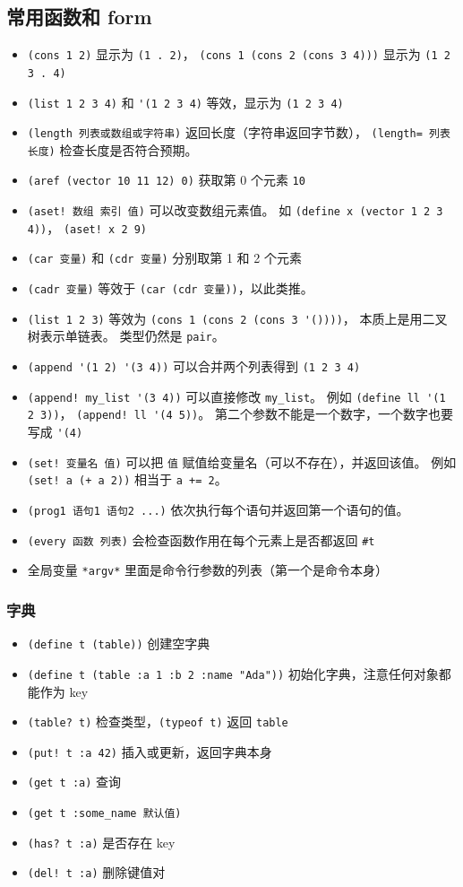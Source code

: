 \subsection{常用函数和 form}
\begin{itemize}
\item \verb`(cons 1 2)` 显示为 \verb`(1 . 2)`， \verb`(cons 1 (cons 2 (cons 3 4)))` 显示为 \verb`(1 2 3 . 4)`
\item \verb`(list 1 2 3 4)` 和 \verb`'(1 2 3 4)` 等效，显示为 \verb`(1 2 3 4)`
\item \verb`(length 列表或数组或字符串)` 返回长度（字符串返回字节数）， \verb`(length= 列表 长度)` 检查长度是否符合预期。
\item \verb`(aref (vector 10 11 12) 0)` 获取第 0 个元素 \verb`10`
\item \verb`(aset! 数组 索引 值)` 可以改变数组元素值。 如 \verb`(define x (vector 1 2 3 4))`， \verb`(aset! x 2 9)`
\item \verb`(car 变量)` 和 \verb`(cdr 变量)` 分别取第 1 和 2 个元素
\item \verb`(cadr 变量)` 等效于 \verb`(car (cdr 变量))`，以此类推。
\item \verb`(list 1 2 3)` 等效为 \verb`(cons 1 (cons 2 (cons 3 '())))`， 本质上是用二叉树表示单链表。 类型仍然是 \verb`pair`。
\item \verb`(append '(1 2) '(3 4))` 可以合并两个列表得到 \verb`(1 2 3 4)`
\item \verb`(append! my_list '(3 4))` 可以直接修改 \verb`my_list`。 例如 \verb`(define ll '(1 2 3))`， \verb`(append! ll '(4 5))`。 第二个参数不能是一个数字，一个数字也要写成 \verb`'(4)`
\item \verb`(set! 变量名 值)` 可以把 \verb`值` 赋值给变量名（可以不存在），并返回该值。 例如 \verb`(set! a (+ a 2))` 相当于 \verb`a += 2`。
\item \verb`(prog1 语句1 语句2 ...)` 依次执行每个语句并返回第一个语句的值。
\item \verb`(every 函数 列表)` 会检查函数作用在每个元素上是否都返回 \verb`#t`
\item 全局变量 \verb`*argv*` 里面是命令行参数的列表（第一个是命令本身）
\end{itemize}

\subsubsection{字典}
\begin{itemize}
\item \verb`(define t (table))` 创建空字典
\item \verb`(define t (table :a 1 :b 2 :name "Ada"))` 初始化字典，注意任何对象都能作为 key
\item \verb`(table? t)` 检查类型，\verb`(typeof t)` 返回 \verb`table`
\item \verb`(put! t :a 42)` 插入或更新，返回字典本身
\item \verb`(get t :a)` 查询
\item \verb`(get t :some_name 默认值)` 
\item \verb`(has? t :a)` 是否存在 key
\item \verb`(del! t :a)` 删除键值对
\end{itemize}


